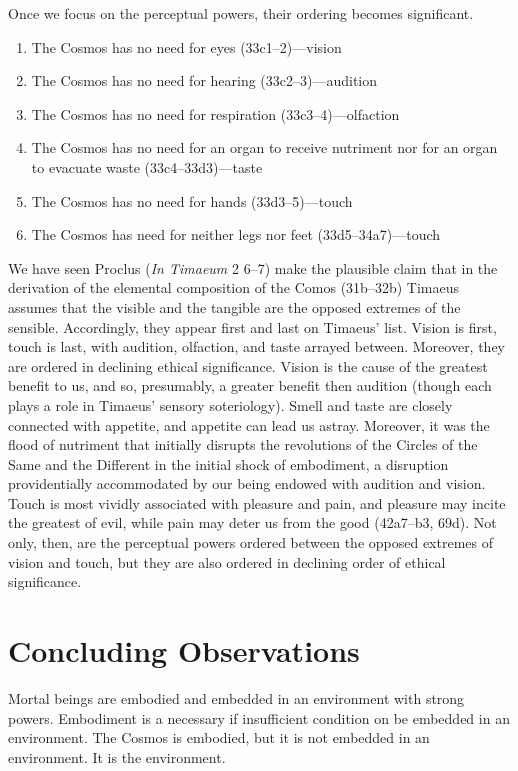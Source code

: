 Once we focus on the perceptual powers, their ordering becomes significant. 
\begin{enumerate}[(1)]
	\item The Cosmos has no need for eyes (33c1–2)---vision
	\item The Cosmos has no need for hearing (33c2–3)---audition
	\item The Cosmos has no need for respiration (33c3–4)---olfaction
	\item The Cosmos has no need for an organ to receive nutriment nor for an organ to evacuate waste (33c4–33d3)---taste
	\item The Cosmos has no need for hands (33d3–5)---touch
	\item The Cosmos has need for neither legs nor feet (33d5–34a7)---touch
\end{enumerate}
We have seen Proclus (\emph{In Timaeum} 2 6--7) make the plausible claim that in the derivation of the elemental composition of the Comos (31b--32b) Timaeus assumes that the visible and the tangible are the opposed extremes of the sensible. Accordingly, they appear first and last on Timaeus' list. Vision is first, touch is last, with audition, olfaction, and taste arrayed between. Moreover, they are ordered in declining ethical significance. Vision is the cause of the greatest benefit to us, and so, presumably, a greater benefit then audition (though each plays a role in Timaeus' sensory soteriology). Smell and taste are closely connected with appetite, and appetite can lead us astray. Moreover, it was the flood of nutriment that initially disrupts the revolutions of the Circles of the Same and the Different in the initial shock of embodiment, a disruption providentially accommodated by our being endowed with audition and vision. Touch is most vividly associated with pleasure and pain, and pleasure may incite the greatest of evil, while pain may deter us from the good (42a7–b3, 69d). Not only, then, are the perceptual powers ordered between the opposed extremes of vision and touch, but they are also ordered in declining order of ethical significance.


\section{Concluding Observations} %
\label{sec:concluding_observations_incarnation}

Mortal beings are embodied and embedded in an environment with strong powers. Embodiment is a necessary if insufficient condition on be embedded in an environment. The Cosmos is embodied, but it is not embedded in an environment. It is the environment. 

